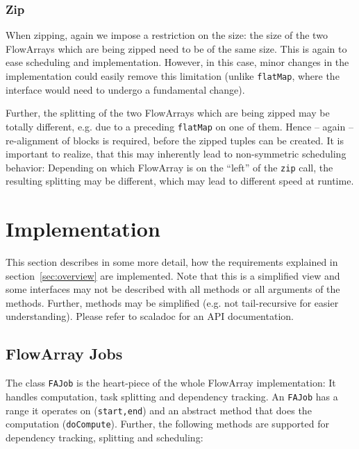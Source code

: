 \documentclass[runningheads,a4paper,fleqn]{llncs}
\begin{document}
\subsubsection{Zip}
When zipping, again we impose a restriction on the size: the size of
the two FlowArrays which are being zipped need to be of the same
size. This is again to ease scheduling and implementation. However, in
this case, minor changes in the implementation could easily remove
this limitation (unlike \texttt{flatMap}, where the interface would
need to undergo a fundamental change).

Further, the splitting of the two FlowArrays which are being zipped
may be totally different, e.g. due to a preceding \texttt{flatMap} on
one of them. Hence -- again -- re-alignment of blocks is required,
before the zipped tuples can be created. It is important to realize,
that this may inherently lead to non-symmetric scheduling behavior:
Depending on which FlowArray is on the ``left'' of the \texttt{zip}
call, the resulting splitting may be different, which may lead to
different speed at runtime. 

\section{Implementation}
\label{sec:implementation}

This section describes in some more detail, how the requirements
explained in section~\ref{sec:overview} are implemented. Note that
this is a simplified view and some interfaces may not be described
with all methods or all arguments of the methods. Further, methods may
be simplified (e.g. not tail-recursive for easier
understanding). Please refer to scaladoc for an API documentation.

\subsection{FlowArray Jobs}
The class \texttt{FAJob} is the heart-piece of the whole FlowArray
implementation: It handles computation, task splitting and dependency
tracking. An \texttt{FAJob} has a range it operates on
(\texttt{start,end}) and an abstract method that does the computation
(\texttt{doCompute}). Further, the following methods are supported for
dependency tracking, splitting and scheduling:
\end{document}
